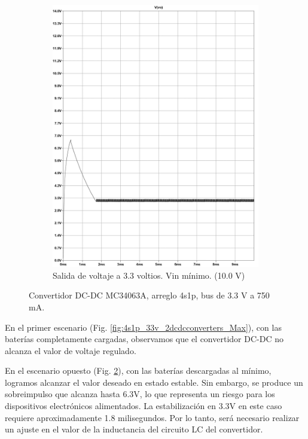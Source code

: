 \begin{figure}[h]
\begin{subfigure}{0.48\linewidth}
    \includegraphics[width=\textwidth]{Pictures/Convertidor DC-DC MC34063A, bus 3.3 v a 750 mA_page-0001 Min.jpg}
    \caption{Salida de voltaje a 3.3 voltios. Vin mínimo. (10.0 V)}
    \label{fig:4s1p_33v_2dcdcconverters_min}
  \end{subfigure}
  \caption{Convertidor DC-DC MC34063A, arreglo 4s1p, bus de 3.3 V a 750 mA.}
  \label{fig:ConveridorDCDC_4S1P_33V}
\end{figure}

En el primer escenario (Fig. \ref{fig:4s1p_33v_2dcdcconverters_Max}), con las baterías completamente cargadas, observamos que el convertidor DC-DC no alcanza el valor de voltaje regulado.

En el escenario opuesto (Fig. \ref{fig:ConveridorDCDC_4S1P_33V}), con las baterías descargadas al mínimo, logramos alcanzar el valor deseado en estado estable. Sin embargo, se produce un sobreimpulso que alcanza hasta 6.3V, lo que representa un riesgo para los dispositivos electrónicos alimentados. La estabilización en 3.3V en este caso requiere aproximadamente 1.8 milisegundos. Por lo tanto, será necesario realizar un ajuste en el valor de la inductancia del circuito LC del convertidor.


